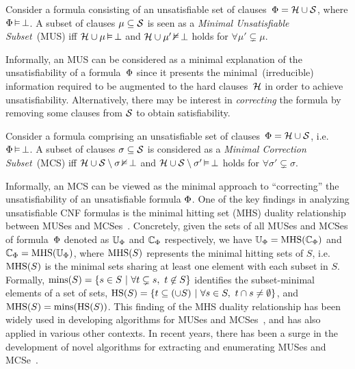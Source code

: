 \begin{definition} \label{def:mus}
  Consider a formula consisting of an unsatisfiable set of clauses~$\Phi={\mathcal{H}}\cup{\mathcal{S}}$,
  where $\Phi\operatorname*{\vDash}\bot$.
  A subset of clauses $\mu\subseteq{\mathcal{S}}$ is seen as a \emph{Minimal Unsatisfiable Subset}~(MUS) 
  iff ${\mathcal{H}}\cup\mu\operatorname*{\vDash}\bot$ and ${\mathcal{H}}\cup\mu'\operatorname*{\nvDash}\bot$ holds for $\forall{\mu'\subsetneq\mu}$.
\end{definition}
%
Informally, an MUS can be considered as a minimal explanation of the unsatisfiability of a formula~$\Phi$
since it presents the minimal~(irreducible) information required to be augmented to the 
hard clauses~${\mathcal{H}}$ in order to achieve unsatisfiability.
%
Alternatively, there may be interest in \emph{correcting} the formula by 
removing some clauses from ${\mathcal{S}}$ to obtain satisfiability.
%
\begin{definition} \label{def:mcs}
  Consider a formula comprising an unsatisfiable set of clauses~$\Phi={\mathcal{H}}\cup{\mathcal{S}}$, 
  i.e. $\Phi\operatorname*{\vDash}\bot$.
  A subset of clauses $\sigma\subseteq{\mathcal{S}}$ is considered as a 
  \emph{Minimal Correction Subset}~(MCS) iff
  ${\mathcal{H}}\cup{\mathcal{S}}\setminus\sigma\operatorname*{\nvDash}\bot$ and 
  ${\mathcal{H}}\cup{\mathcal{S}}\setminus\sigma'\operatorname*{\vDash}\bot$ holds for
  $\forall{\sigma'\subsetneq\sigma}$.
\end{definition}
%
Informally, an MCS can be viewed as the minimal approach to ``correcting'' 
the unsatisfiability of an unsatisfiable formula $\Phi$.
%
One of the key findings in analyzing unsatisfiable CNF formulas is
the minimal hitting set (MHS) duality relationship between MUSes 
and MCSes~\cite{reiter-aij87,lozinskii-jetai03}.
%
Concretely, given the sets of all MUSes and MCSes of formula~$\Phi$
denoted as $\mathbb{U}_\Phi$ and $\mathbb{C}_\Phi$ respectively,  
we have $\mathbb{U}_\Phi = \textrm{MHS}(\mathbb{C}_\Phi)$ and $\mathbb{C}_\Phi = \textrm{MHS}(\mathbb{U}_\Phi)$,
where $\textrm{MHS}(S)$ represents the minimal hitting sets of $S$, i.e.
$\textrm{MHS}(S)$ is the minimal sets sharing at least one element with each subset in $S$.
%
Formally, $\textrm{mins}(S) = \{ s \in S ~|~ \forall t
\subsetneq s,~t \not\in S\}$ identifies the subset-minimal elements of a
set of sets, $\textrm{HS}(S) = \{ t \subseteq (\cup S) ~|~ \forall s \in S,~
t \cap s \neq \emptyset\}$, and $\textrm{MHS}(S) = \textrm{mins}(\textrm{HS}(S))$.
%
This finding of the MHS duality relationship has been widely used 
in developing algorithms for MUSes and MCSes~\cite{stuckey-padl05,liffiton-jar08,lpmms-cj16}, 
and has also applied in various other contexts.
%
In recent years, there has been a surge in the development of novel algorithms 
for extracting and enumerating MUSes and
MCSe~\cite{mpms-ijcai15,bacchus-cav15,lpmms-cj16,mipms-sat16,pmjms-aaai18,lagniez-ijcai18,narodytska-ijcai18,bendik-atva18}.
